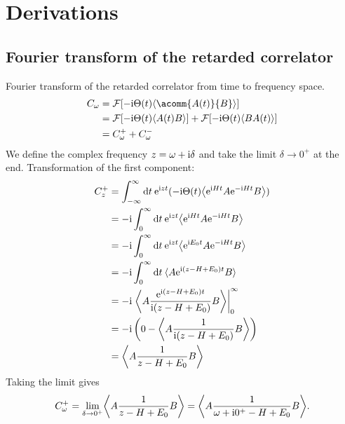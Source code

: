 
\chapter{Derivations}

\section{Fourier transform of the retarded correlator}
\label{app:fourier-transform}

Fourier transform of the retarded correlator from time to frequency space.
\begin{align}
    C_\omega
     & =
    \mathcal{F}[-\mi \Theta(t) \expval{\acomm{A(t)}{B}}] \\
     & =
    \mathcal{F}[-\mi \Theta(t) \expval{A(t) B}]
    +
    \mathcal{F}[-\mi \Theta(t) \expval{B A(t)}]          \\
     & =
    C^+_\omega + C^-_\omega
\end{align}
We define the complex frequency $z=\omega+\mathrm{i}\delta$ and take the limit $\delta\to0^+$ at the end.
Transformation of the first component:
\begin{align}
    C^+_z
     & =
    \int_{-\infty}^\infty \md t \>
    \me^{\mi zt}(-\mi \Theta(t) \expval*{\me^{\mi Ht} A \me^{-\mi Ht} B}) \\
     & =
    -\mi \int_0^\infty \md t \>
    \me^{\mi zt} \expval*{\me^{\mi Ht} A \me^{-\mi Ht} B}                 \\
     & =
    -\mi \int_0^\infty \md t \>
    \me^{\mi zt} \expval*{\me^{\mi E_0t} A \me^{-\mi Ht} B}               \\
     & =
    -\mi \int_0^\infty \md t \>
    \expval{A \me^{\mi(z - H + E_0)t} B}                                  \\
     & =
    -\mi \left.\expval*{A \frac{\me^{\mi(z - H + E_0)t}}{\mi(z - H + E_0)} B}
    \right|_0^\infty                                                      \\
     & =
    -\mi \left(0 - \expval*{A \frac{1}{\mi(z - H + E_0)} B}\right)        \\
     & =
    \expval*{A \frac{1}{z - H + E_0} B}
\end{align}
Taking the limit gives
\begin{equation}
    C^+_\omega
    =
    \lim_{\delta\to0^+} \expval*{A \frac{1}{z - H + E_0} B}
    =
    \expval*{A \frac{1}{\omega + \mi0^+ - H + E_0} B}.
\end{equation}
